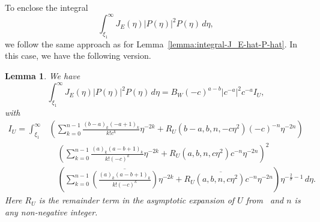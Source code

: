 \documentclass[11pt]{article}
\newcommand{\conj}[1]{\overline{#1}}
\newtheorem{lemma}[definition]{Lemma}
\begin{document}
To enclose the integral
\begin{equation*}
  \int_{\xi_{1}}^{\infty} J_{E}(\eta)|P(\eta)|^{2}P(\eta)\,d\eta,
\end{equation*}
we follow the same approach as for
Lemma~\ref{lemma:integral-J_E-hat-P-hat}. In this case, we have the
following version.

\begin{lemma}\label{lemma:I_E_infty-integral}
  We have
  \begin{equation*}
    \int_{\xi_{1}}^{\infty} J_{E}(\eta)|P(\eta)|^{2}P(\eta)\,d\eta
    = B_{W}(-c)^{a - b}|c^{-a}|^{2}c^{-a}I_{U},
  \end{equation*}
  with
  \begin{equation*}
    \begin{split}
      I_{U}
      = \int_{\xi_{1}}^{\infty}
      &\left(
        \sum_{k = 0}^{n - 1} \frac{(b - a)_{k}(-a + 1)_{k}}{k!c^{k}}\eta^{-2k}
        + R_{U}(b - a, b, n, -c\eta^{2})(-c)^{-n}\eta^{-2n}
        \right)\\
      &\quad\left(
        \sum_{k = 0}^{n - 1} \frac{(a)_{k}(a - b + 1)_{k}}{k!(-c)^{k}}\eta^{-2k}
        + R_{U}(a, b, n, c\eta^{2})c^{-n}\eta^{-2n}
        \right)^{2}\\
      &\quad\left(
        \sum_{k = 0}^{n - 1} \conj{\left(\frac{(a)_{k}(a - b + 1)_{k}}{k!(-c)^{k}}\right)}\eta^{-2k}
        + \conj{R_{U}(a, b, n, c\eta^{2})c^{-n}}\eta^{-2n}
        \right)\eta^{-\frac{2}{\sigma} - 1}\,d\eta.
    \end{split}
  \end{equation*}
  Here \(R_{U}\) is the remainder term in the asymptotic expansion of
  \(U\) from~\cite[Lemma~7.1]{Dahne2024} and \(n\) is any
  non-negative integer.
\end{lemma}
\end{document}
